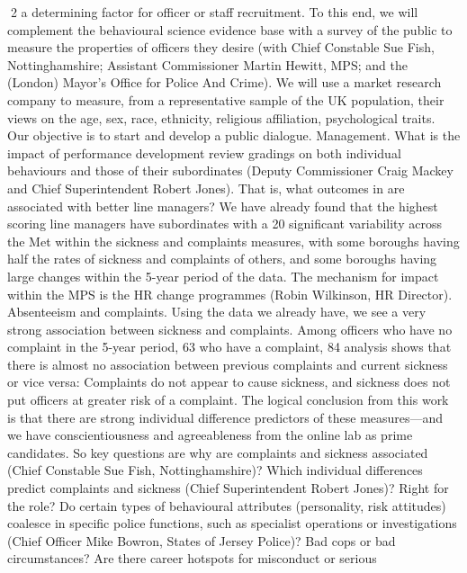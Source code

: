 2
a determining factor for officer or staff recruitment. To this end, we will complement the
behavioural science evidence base with a survey of the public to measure the properties of
officers they desire (with Chief Constable Sue Fish, Nottinghamshire; Assistant
Commissioner Martin Hewitt, MPS; and the (London) Mayor’s Office for Police And Crime).
We will use a market research company to measure, from a representative sample of the UK
population, their views on the age, sex, race, ethnicity, religious affiliation, psychological
traits. Our objective is to start and develop a public dialogue.
Management. What is the impact of performance development review gradings on both
individual behaviours and those of their subordinates (Deputy Commissioner Craig Mackey
and Chief Superintendent Robert Jones). That is, what outcomes in are associated with
better line managers? We have already found that the highest scoring line managers have
subordinates with a 20%
significant variability across the Met within the sickness and complaints measures, with
some boroughs having half the rates of sickness and complaints of others, and some
boroughs having large changes within the 5-year period of the data. The mechanism for
impact within the MPS is the HR change programmes (Robin Wilkinson, HR Director).
Absenteeism and complaints. Using the data we already have, we see a very strong
association between sickness and complaints. Among officers who have no complaint in the
5-year period, 63%
who have a complaint, 84%
analysis shows that there is almost no association between previous complaints and current
sickness or vice versa: Complaints do not appear to cause sickness, and sickness does not
put officers at greater risk of a complaint. The logical conclusion from this work is that there
are strong individual difference predictors of these measures—and we have
conscientiousness and agreeableness from the online lab as prime candidates. So key
questions are why are complaints and sickness associated (Chief Constable Sue Fish,
Nottinghamshire)? Which individual differences predict complaints and sickness (Chief
Superintendent Robert Jones)?
Right for the role? Do certain types of behavioural attributes (personality, risk attitudes)
coalesce in specific police functions, such as specialist operations or investigations (Chief
Officer Mike Bowron, States of Jersey Police)?
Bad cops or bad circumstances? Are there career hotspots for misconduct or serious
